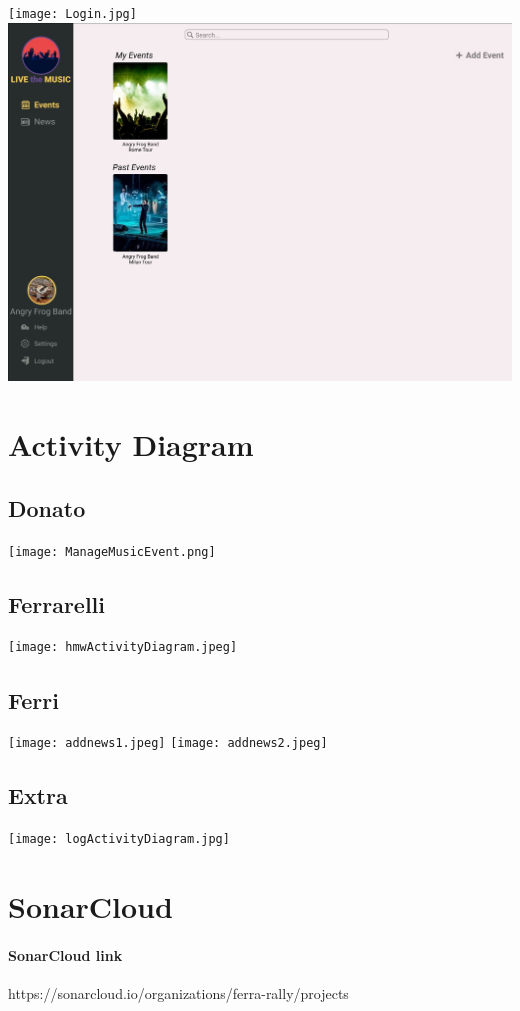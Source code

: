 \documentclass[11pt,a4paper]{article}
\begin{document}
\begin{itemize}
\texttt{[image: Login.jpg]}
\includegraphics[scale=0.25]{AddEvent.jpg}
\section{Activity Diagram}
\subsection{Donato}
\texttt{[image: ManageMusicEvent.png]}
\subsection{Ferrarelli}
\texttt{[image: hmwActivityDiagram.jpeg]}
\subsection{Ferri}
\texttt{[image: addnews1.jpeg]}
\texttt{[image: addnews2.jpeg]}
\subsection{Extra}
\texttt{[image: logActivityDiagram.jpg]}
\section{SonarCloud}
\paragraph{SonarCloud link} https://sonarcloud.io/organizations/ferra-rally/projects
\end{itemize}
\end{document}

